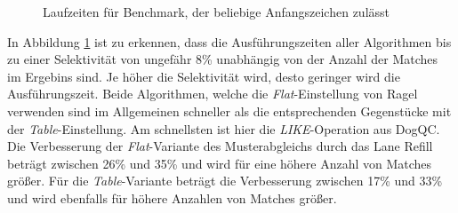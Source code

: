 \begin{figure}[ht]
	\centering
	\caption{Laufzeiten für Benchmark, der beliebige Anfangszeichen zulässt}
	\label{fig:regex_ANYdblpANY}
\end{figure}

In Abbildung \ref{fig:regex_ANYdblpANY} ist zu erkennen, dass die Ausführungszeiten aller Algorithmen bis zu einer Selektivität von ungefähr 8\% unabhängig von der Anzahl der Matches im Ergebins sind.
Je höher die Selektivität wird, desto geringer wird die Ausführungszeit.
Beide Algorithmen, welche die \emph{Flat}-Einstellung von Ragel verwenden sind im Allgemeinen schneller als die entsprechenden Gegenstücke mit der \emph{Table}-Einstellung.
Am schnellsten ist hier die \emph{LIKE}-Operation aus DogQC.
Die Verbesserung der \emph{Flat}-Variante des Musterabgleichs durch das Lane Refill beträgt zwischen 26\% und 35\% und wird für eine höhere Anzahl von Matches größer.
Für die \emph{Table}-Variante beträgt die Verbesserung zwischen 17\% und 33\% und wird ebenfalls für höhere Anzahlen von Matches größer.

